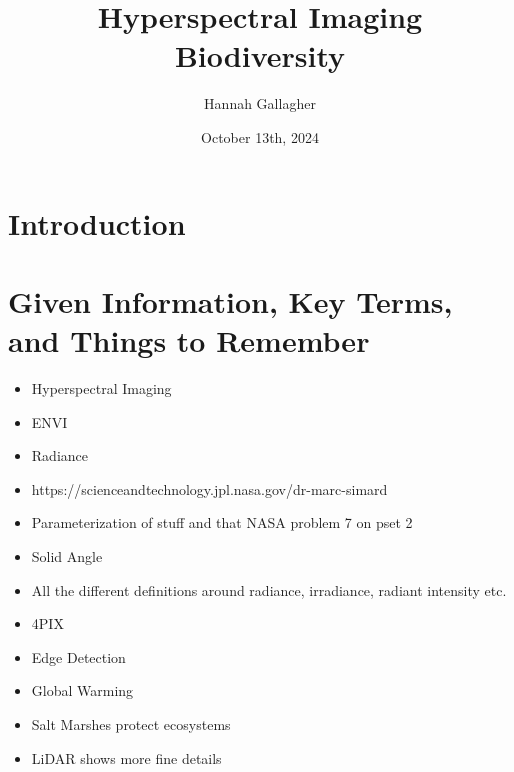\documentclass{article}
\title{Hyperspectral Imaging Biodiversity}
\author{Hannah Gallagher}
\date{October 13th, 2024}
\begin{document}
\maketitle

\section{Introduction}






\section{Given Information, Key Terms, and Things to Remember} 
\begin{itemize}
\item Hyperspectral Imaging
\item ENVI
\item Radiance
\item https://scienceandtechnology.jpl.nasa.gov/dr-marc-simard
\item Parameterization of stuff and that NASA problem 7 on pset 2
\item Solid Angle 
\item All the different definitions around radiance, irradiance, radiant intensity etc.
\item 4PIX
\item Edge Detection
\item Global Warming
\item Salt Marshes protect ecosystems
\item LiDAR shows more fine details




 
\end{itemize}
\end{document}

